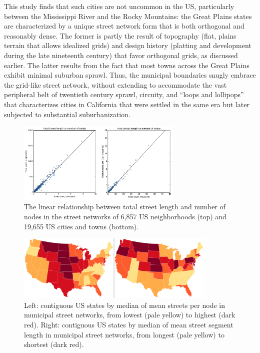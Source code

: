 \documentclass{article}
\begin{document}
This study finds that such cities are not uncommon in the US, particularly between the Mississippi River and the Rocky Mountains: the Great Plains states are characterized by a unique street network form that is both orthogonal and reasonably dense. The former is partly the result of topography (flat, plains terrain that allows idealized grids) and design history (platting and development during the late nineteenth century) that favor orthogonal grids, as discussed earlier. The latter results from the fact that most towns across the Great Plains exhibit minimal suburban sprawl. Thus, the municipal boundaries snugly embrace the grid-like street network, without extending to accommodate the vast peripheral belt of twentieth century sprawl, circuity, and \enquote{loops and lollipops} \cite{southworth_streets_1997} that characterizes cities in California that were settled in the same era but later subjected to substantial suburbanization.

\begin{figure}
	\includegraphics[width=0.7\textwidth]{media/fig03.png}
	\caption{The linear relationship between total street length and number of nodes in the street networks of 6,857 US neighborhoods (top) and 19,655 US cities and towns (bottom).}
	\label{fig03}
\end{figure}

\begin{figure}
	\includegraphics[width=0.85\textwidth]{media/fig04.png}
	\caption{Left: contiguous US states by median of mean streets per node in municipal street networks, from lowest (pale yellow) to highest (dark red). Right: contiguous US states by median of mean street segment length in municipal street networks, from longest (pale yellow) to shortest (dark red).}
	\label{fig04}
\end{figure}
\end{document}
